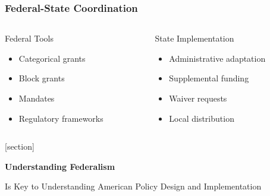 \documentclass[10pt]{beamer}
\begin{document}
\begin{frame}
\frametitle{Federal-State Coordination}

\begin{columns}
\begin{column}{0.48\textwidth}
\begin{block}{Federal Tools}
\pause
\begin{itemize}
\item Categorical grants
\item Block grants
\item Mandates
\item Regulatory frameworks
\end{itemize}
\end{block}
\end{column}

\begin{column}{0.48\textwidth}
\begin{block}{State Implementation}
\pause
\begin{itemize}
\item Administrative adaptation
\item Supplemental funding
\item Waiver requests
\item Local distribution
\end{itemize}
\end{block}
\end{column}
\end{columns}

\end{frame}

{
[section]
\begin{frame}[plain]
\vspace{1.5cm}
\begin{center}
{\Huge\color{white}\textbf{Understanding Federalism}}

\vspace{0.8cm}
{\Large\color{white}Is Key to Understanding American Policy}
{\Large\color{white}Design and Implementation}
\end{center}
\end{frame}
}
\end{document}
